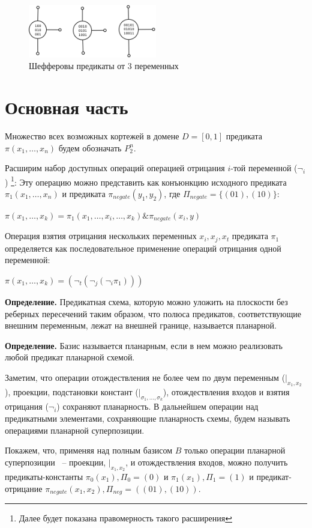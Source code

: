 \documentclass[12pt]{article}
\begin{document}
\begin{figure}[htb]
\centering
\includegraphics[width=0.5\textwidth]{scheff3.png}
\caption{Шефферовы предикаты от 3 переменных}
\label{fig:sheff}
\end{figure}


\section{Основная часть}

Множество всех возможных кортежей в домене $D=[0,1]$ предиката $\pi(x_1, \dots, x_n)$ будем обозначать $P_2^n$. 

Расширим набор доступных операций операцией отрицания $i$-той переменной ($\neg_i$) \footnote{
Далее будет показана правомерность такого расширения}:
Эту операцию можно представить как конъюнкцию исходного предиката $\pi_1(x_1, \dots, x_n)$ и предиката
$\pi_{negate}(y_1, y_2)$, где $\Pi_{negate} = \{ (01), (10) \}$:

$\pi(x_1, \dots, x_k) = \pi_1(x_1, \dots, x_i, \dots, x_k) \& \pi_{negate}(x_i, y)$ 

Операция взятия отрицания нескольких переменных $x_i, x_j, x_t$ предиката $\pi_1$
определяется как последовательное применение операций отрицания одной переменной:

$\pi(x_1, \dots, x_k) = (\neg_t (\neg_j (\neg_i \pi_1)))$

\textbf{Определение.} 
Предикатная схема, которую можно уложить на плоскости без реберных пересечений таким образом, что полюса предикатов, 
соответствующие внешним переменным, лежат на внешней границе, называется планарной. 

\textbf{Определение.} Базис называется планарным, если в нем можно реализовать любой предикат планарной схемой.

Заметим, что операции отождествления не более чем по двум переменным ($|_{x_1, x_2}$), проекции,
подстановки констант ($|_{\sigma_1, \dots, \sigma_k}$), отождествления входов и взятия отрицания ($\neg_i$)
сохраняют планарность. В дальнейшем операции над предикатными элементами, сохраняющие планарность схемы,
будем называть операциями планарной суперпозиции.

Покажем, что, применяя над полным базисом $B$ только операции планарной суперпозиции ~-- проекции, $|_{x_1, x_2}$,
и отождествления входов, можно получить предикаты-константы
$\pi_0(x_1), \Pi_0=(0)$ и $\pi_1(x_1), \Pi_1=(1)$ и предикат-отрицание $\pi_{negate}(x_1, x_2), \Pi_{neg}=( (01), (10) )$.
\end{document}
